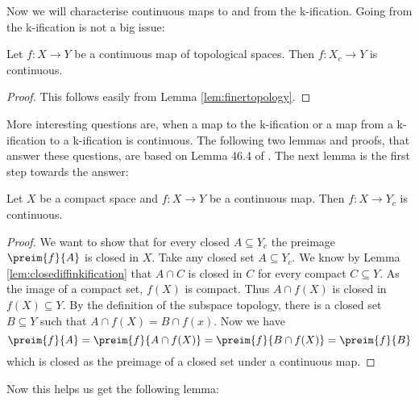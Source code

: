 Now we will characterise continuous maps to and from the k-ification. 
Going from the k-ification is not a big issue: 

\begin{lem}\label{lem:continuousfromkification}
    Let $f \colon X \to Y$ be a continuous map of topological spaces.
    Then $f \colon X_c \to Y$ is continuous.
    \href{https://github.com/scholzhannah/CWComplexes/blob/7be4872a05b534011cc969eb5b80a4b7f0bf57e2/CWcomplexes/KSpace.lean#L268-L273}{\faExternalLink}
\end{lem}
\begin{proof}
    This follows easily from Lemma \ref{lem:finertopology}.
\end{proof}

More interesting questions are, when a map to the k-ification or a map from a k-ification to a k-ification is continuous. 
The following two lemmas and proofs, that answer these questions, are based on Lemma 46.4 of \cite{Munkres2014}.
The next lemma is the first step towards the answer:

\begin{lem}\label{lem:continuoustokification}
    Let $X$ be a compact space and $f \colon X \to Y$ be a continuous map. 
    Then $f \colon X \to Y_c$ is continuous.
    \href{https://github.com/scholzhannah/CWComplexes/blob/7be4872a05b534011cc969eb5b80a4b7f0bf57e2/CWcomplexes/KSpace.lean#L284-L294}{\faExternalLink}
\end{lem}
\begin{proof}
    We want to show that for every closed $A \subseteq Y_c$ the preimage $\preim{f}{A}$ is closed in $X$.
    Take any closed set $A \subseteq Y_c$. 
    We know by Lemma \ref{lem:closediffinkification} that $A \cap C$ is closed in $C$ for every compact $C \subseteq Y$.
    As the image of a compact set, $f(X)$ is compact. 
    Thus $A \cap f(X)$ is closed in $f(X) \subseteq Y$. 
    By the definition of the subspace topology, there is a closed set $B \subseteq Y$ such that $A \cap f(X) = B \cap f(x)$. 
    Now we have 
    \[\preim{f}{A} = \preim{f}{A \cap f(X)} = \preim{f}{B \cap f(X)} = \preim{f}{B}\]
    which is closed as the preimage of a closed set under a continuous map.
\end{proof}

Now this helps us get the following lemma:

